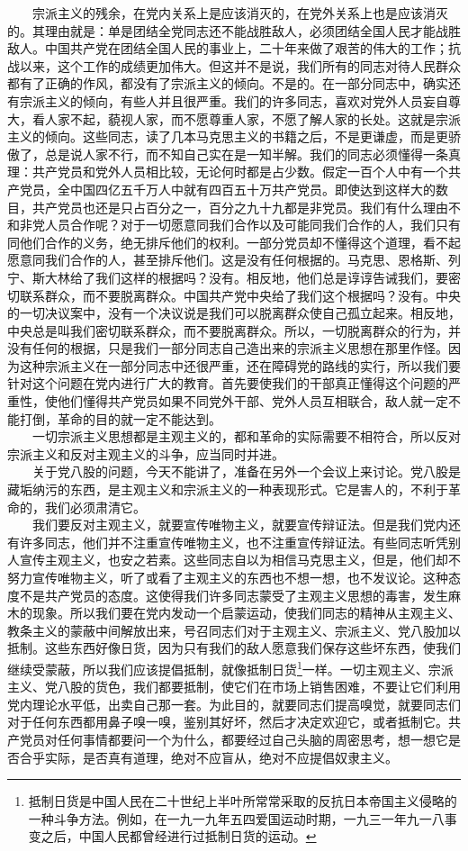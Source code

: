 \documentclass[cn,11pt,chinese]{elegantbook}
\begin{document}
　　宗派主义的残余，在党内关系上是应该消灭的，在党外关系上也是应该消灭的。其理由就是：单是团结全党同志还不能战胜敌人，必须团结全国人民才能战胜敌人。中国共产党在团结全国人民的事业上，二十年来做了艰苦的伟大的工作；抗战以来，这个工作的成绩更加伟大。但这并不是说，我们所有的同志对待人民群众都有了正确的作风，都没有了宗派主义的倾向。不是的。在一部分同志中，确实还有宗派主义的倾向，有些人并且很严重。我们的许多同志，喜欢对党外人员妄自尊大，看人家不起，藐视人家，而不愿尊重人家，不愿了解人家的长处。这就是宗派主义的倾向。这些同志，读了几本马克思主义的书籍之后，不是更谦虚，而是更骄傲了，总是说人家不行，而不知自己实在是一知半解。我们的同志必须懂得一条真理：共产党员和党外人员相比较，无论何时都是占少数。假定一百个人中有一个共产党员，全中国四亿五千万人中就有四百五十万共产党员。即使达到这样大的数目，共产党员也还是只占百分之一，百分之九十九都是非党员。我们有什么理由不和非党人员合作呢？对于一切愿意同我们合作以及可能同我们合作的人，我们只有同他们合作的义务，绝无排斥他们的权利。一部分党员却不懂得这个道理，看不起愿意同我们合作的人，甚至排斥他们。这是没有任何根据的。马克思、恩格斯、列宁、斯大林给了我们这样的根据吗？没有。相反地，他们总是谆谆告诫我们，要密切联系群众，而不要脱离群众。中国共产党中央给了我们这个根据吗？没有。中央的一切决议案中，没有一个决议说是我们可以脱离群众使自己孤立起来。相反地，中央总是叫我们密切联系群众，而不要脱离群众。所以，一切脱离群众的行为，并没有任何的根据，只是我们一部分同志自己造出来的宗派主义思想在那里作怪。因为这种宗派主义在一部分同志中还很严重，还在障碍党的路线的实行，所以我们要针对这个问题在党内进行广大的教育。首先要使我们的干部真正懂得这个问题的严重性，使他们懂得共产党员如果不同党外干部、党外人员互相联合，敌人就一定不能打倒，革命的目的就一定不能达到。\\
　　一切宗派主义思想都是主观主义的，都和革命的实际需要不相符合，所以反对宗派主义和反对主观主义的斗争，应当同时并进。\\
　　关于党八股的问题，今天不能讲了，准备在另外一个会议上来讨论。党八股是藏垢纳污的东西，是主观主义和宗派主义的一种表现形式。它是害人的，不利于革命的，我们必须肃清它。\\
　　我们要反对主观主义，就要宣传唯物主义，就要宣传辩证法。但是我们党内还有许多同志，他们并不注重宣传唯物主义，也不注重宣传辩证法。有些同志听凭别人宣传主观主义，也安之若素。这些同志自以为相信马克思主义，但是，他们却不努力宣传唯物主义，听了或看了主观主义的东西也不想一想，也不发议论。这种态度不是共产党员的态度。这使得我们许多同志蒙受了主观主义思想的毒害，发生麻木的现象。所以我们要在党内发动一个启蒙运动，使我们同志的精神从主观主义、教条主义的蒙蔽中间解放出来，号召同志们对于主观主义、宗派主义、党八股加以抵制。这些东西好像日货，因为只有我们的敌人愿意我们保存这些坏东西，使我们继续受蒙蔽，所以我们应该提倡抵制，就像抵制日货\footnote[9]{ 抵制日货是中国人民在二十世纪上半叶所常常采取的反抗日本帝国主义侵略的一种斗争方法。例如，在一九一九年五四爱国运动时期，一九三一年九一八事变之后，中国人民都曾经进行过抵制日货的运动。}一样。一切主观主义、宗派主义、党八股的货色，我们都要抵制，使它们在市场上销售困难，不要让它们利用党内理论水平低，出卖自己那一套。为此目的，就要同志们提高嗅觉，就要同志们对于任何东西都用鼻子嗅一嗅，鉴别其好坏，然后才决定欢迎它，或者抵制它。共产党员对任何事情都要问一个为什么，都要经过自己头脑的周密思考，想一想它是否合乎实际，是否真有道理，绝对不应盲从，绝对不应提倡奴隶主义。\\
\end{document}
